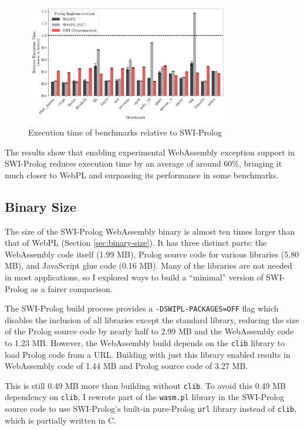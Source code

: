 \begin{figure}[H]
\centering
\includegraphics[width=0.8\textwidth]{relative_performance_exnref.pdf}
\caption{Execution time of benchmarks relative to SWI-Prolog}
\label{fig:swi-prolog-exception}
\end{figure}

The results show that enabling experimental WebAssembly exception support in SWI-Prolog reduces execution time by an average of around 60\%, bringing it much closer to WebPL and surpassing its performance in some benchmarks.

\subsection{Binary Size}

\label{sec:binary-size-opt}

The size of the SWI-Prolog WebAssembly binary is almost ten times larger than that of WebPL (Section \ref{sec:binary-size}). It has three distinct parts: the WebAssembly code itself (1.99 MB), Prolog source code for various libraries (5.80 MB), and JavaScript glue code (0.16 MB). Many of the libraries are not needed in most applications, so I explored ways to build a ``minimal'' version of SWI-Prolog as a fairer comparison.

The SWI-Prolog build process provides a \texttt{-DSWIPL-PACKAGES=OFF} flag which disables the inclusion of all libraries except the standard library, reducing the size of the Prolog source code by nearly half to 2.99 MB and the WebAssembly code to 1.23 MB. However, the WebAssembly build depends on the \texttt{clib} library to load Prolog code from a URL. Building with just this library enabled results in WebAssembly code of 1.44 MB and Prolog source code of 3.27 MB.

This is still 0.49 MB more than building without \texttt{clib}. To avoid this 0.49 MB dependency on \texttt{clib}, I rewrote part of the \texttt{wasm.pl} library in the SWI-Prolog source code to use SWI-Prolog's built-in pure-Prolog \texttt{url} library instead of \texttt{clib}, which is partially written in C.

